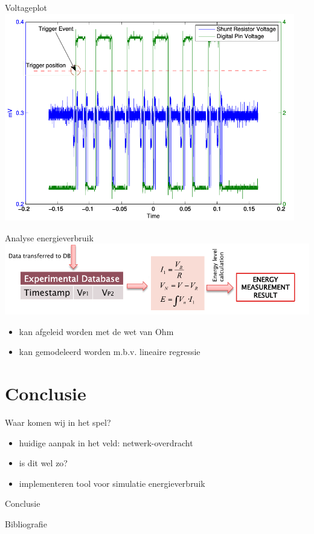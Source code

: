 \documentclass[presentation, bigger]{beamer}
\begin{document}
\begin{frame}[label=sec-3-4]{Voltageplot}
\includegraphics[width=0.95\textwidth,keepaspectration=true]{elek/energy_measurement_plot.png}
\end{frame}

\begin{frame}[label=sec-3-5]{Analyse energieverbruik}
\includegraphics[width=\textwidth,keepaspectration=true]{elek/diag2}
\begin{itemize}
\item kan afgeleid worden met de wet van Ohm
\item kan gemodeleerd worden m.b.v. lineaire regressie
\end{itemize}
\end{frame}
\section{Conclusie}
\label{sec-4}
\begin{frame}[label=sec-4-1]{Waar komen wij in het spel?}
\begin{itemize}
\item huidige aanpak in het veld: netwerk-overdracht
\item is dit wel zo?
\item implementeren tool voor simulatie energieverbruik
\end{itemize}
\end{frame}

\begin{frame}[label=sec-4-2]{Conclusie}
\end{frame}
\begin{frame}[allowframebreaks]{Bibliografie}
\nocite{*}
\printbibliography
\end{frame}

\end{document}

